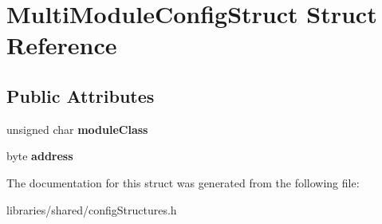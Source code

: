 \hypertarget{struct_multi_module_config_struct}{}\section{Multi\+Module\+Config\+Struct Struct Reference}
\label{struct_multi_module_config_struct}
\subsection*{Public Attributes}
\begin{DoxyCompactItemize}
\item 
\mbox{\label{struct_multi_module_config_struct_af37a06919eec7b44acab6badfe77a4b2}} 
unsigned char {\bfseries module\+Class}
\item 
\mbox{\label{struct_multi_module_config_struct_ac6a7a7fc96381e5b6dc529211323ec02}} 
byte {\bfseries address}
\end{DoxyCompactItemize}


The documentation for this struct was generated from the following file\+:\begin{DoxyCompactItemize}
\item 
libraries/shared/config\+Structures.\+h\end{DoxyCompactItemize}
